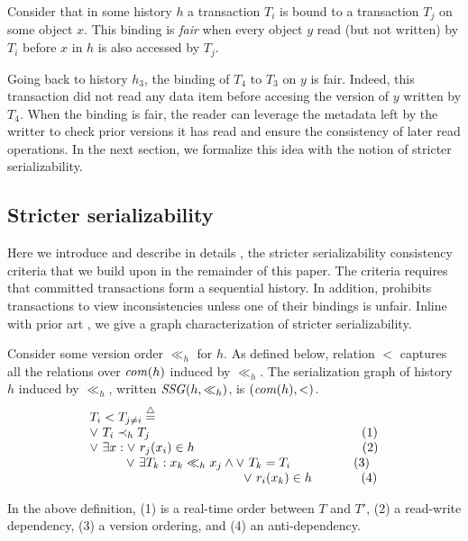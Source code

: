 \begin{definition}
  Consider that in some history $h$ a transaction $T_i$ is bound to a transaction $T_j$ on some object $x$.
  This binding is \emph{fair} when every object $y$ read (but not written) by $T_i$ before $x$ in $h$ is also accessed by $T_j$.
\end{definition}

Going back to history $h_3$, the binding of $T_4$ to $T_3$ on $y$ is fair.
Indeed, this transaction did not read any data item before accesing the version of $y$ written by $T_4$.
When the binding is fair, the reader can leverage the metadata left by the writter to check prior versions it has read and ensure the consistency of later read operations.
In the next section, we formalize this idea with the notion of stricter serializability.

\subsection{Stricter serializability}
Here we introduce and describe in details \SPSER, the stricter serializability consistency criteria that we build upon in the remainder of this paper.
The \sser criteria requires that committed transactions form a sequential history.
In addition, \sser prohibits transactions to view inconsistencies unless one of their bindings is unfair.
Inline with prior art \cite{berstein,opa}, we give a graph characterization of stricter serializability.

\begin{definition}
  Consider some version order $\ll_h$ for $h$.
  As defined below, relation $<$ captures all the relations over $\committed{h}$ induced by $\ll_h$.
  The serialization graph of history $h$ induced by $\ll_h$, written $\SSG(h,\ll_h)$, is $(\committed{h},<)$.
  \begin{displaymath}
    \begin{array}{l}
      T_i < T_{j \neq i}  \equaldef \\
      \lor~ T_i \hb_h T_j {\hspace{16.8em}\text{(1)}} \\
      \lor~ \exists x : \lor~ r_j(x_i) \in h {\hspace{13.3em}\text{(2)}} \\
      \hspace{2.9em}\lor~ \exists T_k : x_k \ll_h x_j \land \lor~T_k = T_i {\hspace{5em}\text{(3)}} \\
      \hspace{12.2em} \lor~ r_i(x_k) \in h {\hspace{3.9em}\text{(4)}}
    \end{array}
  \end{displaymath}  
\end{definition}
In the above definition, (1) is a real-time order between $T$ and $T'$, (2) a read-write dependency, (3) a version ordering, and (4) an anti-dependency.

